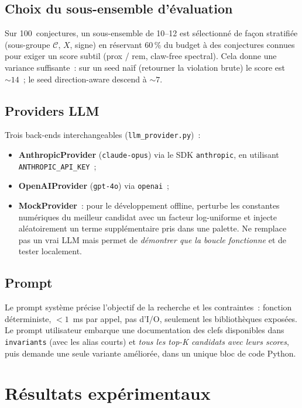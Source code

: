 \documentclass[11pt,a4paper]{article}
\begin{document}
\subsection{Choix du sous-ensemble d'évaluation}

Sur 100~conjectures, un sous-ensemble de 10–12 est sélectionné de façon
stratifiée (sous-groupe $\mathcal{C}$, $X$, signe) en réservant 60\,\% du
budget à des conjectures connues pour exiger un score subtil
(prox / rem, claw-free spectral). Cela donne une variance suffisante~:
sur un seed naïf (retourner la violation brute) le score est
$\sim 14$~; le seed \og{}direction-aware\fg{} descend à $\sim 7$.

\subsection{Providers LLM}

Trois back-ends interchangeables (\texttt{llm\_provider.py})~:
\begin{itemize}
  \item \textbf{AnthropicProvider} (\texttt{claude-opus}) via le SDK
    \texttt{anthropic}, en utilisant \texttt{ANTHROPIC\_API\_KEY}~;
  \item \textbf{OpenAIProvider} (\texttt{gpt-4o}) via \texttt{openai}~;
  \item \textbf{MockProvider}~: pour le développement offline, perturbe les
    constantes numériques du meilleur candidat avec un facteur log-uniforme
    et injecte aléatoirement un terme supplémentaire pris dans une palette.
    Ne remplace pas un vrai LLM mais permet de \emph{démontrer que la boucle
    fonctionne} et de tester localement.
\end{itemize}

\subsection{Prompt}

Le prompt système précise l'objectif de la recherche et les contraintes~:
fonction déterministe, $< 1$~ms par appel, pas d'I/O, seulement les
bibliothèques exposées. Le prompt utilisateur embarque une documentation
des clefs disponibles dans \texttt{invariants} (avec les alias courts) et
\emph{tous les top-K candidats avec leurs scores}, puis demande \og{}une
seule variante améliorée, dans un unique bloc de code Python\fg{}.

\section{Résultats expérimentaux}
\label{sec:resultats}
\end{document}
